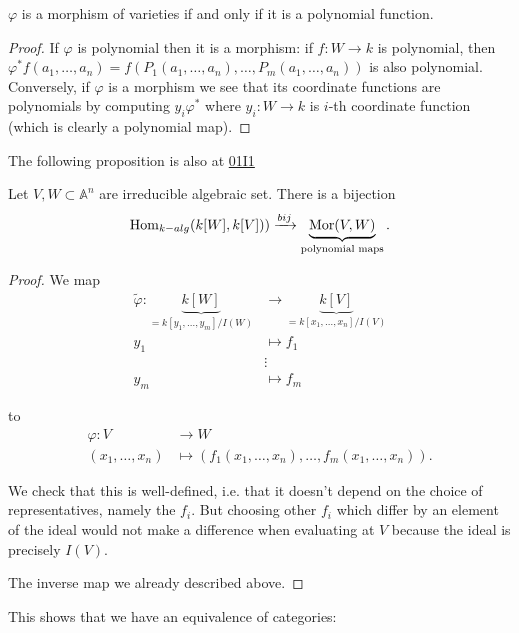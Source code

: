 \begin{exercise}
\label{exercise-morphisms-def}
$\varphi$ is a morphism of varieties if and only if
it is a polynomial function.
\end{exercise}

\begin{proof}
If $\varphi$ is polynomial then it is a morphism:
if $f:W \to k$ is polynomial,
then $\varphi^*f(a_1,…,a_n)=f(P_1(a_1,…,a_n),…,P_m(a_1,…,a_n))$
is also polynomial.
Conversely, if $\varphi$ is a morphism
we see that its coordinate functions are polynomials
by computing $y_i\varphi^*$ where $y_i:W \to k$ 
is $i$-th coordinate function (which is clearly a polynomial map).
\end{proof}

The following proposition is also at
\href{https://stacks.math.columbia.edu/tag/01I1}{01I1}

\begin{proposition}
\label{proposition-irreducible-prime}
Let $V,W \subset \mathbb{A}^n$ are irreducible algebraic set.
There is a bijection
$$
\mathop{\mathrm{Hom}}\nolimits_{k-alg}(k[W],k[V])) \xrightarrow{bij}\underbrace{\mathop{\mathrm{Mor}}\nolimits(V,W)}_{
\text{polynomial maps}}.
$$
\end{proposition}

\begin{proof}
We map
\begin{align*}
\tilde{\varphi}: \underbrace{k[W]}_{=k[y_1,…,y_m]/I(W)} &\longrightarrow 
\underbrace{k[V]}_{=k[x_1,…,x_n]/I(V)} \\
 y_1&\longmapsto f_1\\
&\vdots \\
y_m & \longmapsto f_m
\end{align*}

\noindent
to
\begin{align*}
\varphi: V &\longrightarrow W \\
(x_1,…,x_n) &\longmapsto (f_1(x_1,…,x_n), …, f_m(x_1,…,x_n)).
\end{align*}

\noindent
We check that this is well-defined, i.e.
that it doesn't depend on the choice of representatives,
namely the $f_i$. But choosing other $f_i$ which differ
by an element of the ideal would not make a difference
when evaluating at $V$ because the ideal is precisely $I(V)$.

The inverse map we already described above.
\end{proof}

\noindent
This shows that we have an equivalence of categories:

